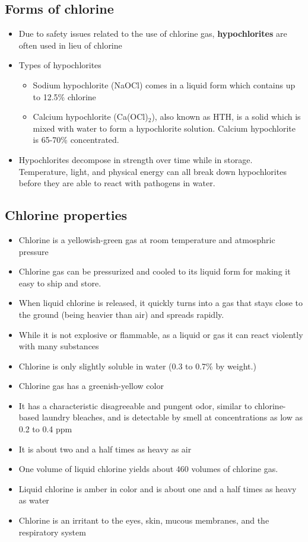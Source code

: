 \subsection{Forms of chlorine}

\begin{itemize}
	\item Due to safety issues related to the use of chlorine gas, \textbf{hypochlorites} are often used in lieu of chlorine
	\item Types of hypochlorites
	\begin{itemize}
	\item Sodium hypochlorite (NaOCl) comes in a liquid form which contains up to 12.5\% chlorine
	\item Calcium hypochlorite (Ca(OCl)$_2$), also known as HTH, is a solid which is mixed with water to form a hypochlorite solution. Calcium hypochlorite is 65-70\% concentrated.
	\end{itemize}
	\item Hypochlorites decompose in strength over time while in storage. Temperature, light, and physical energy can all break down hypochlorites before they are able to react with pathogens in water. 

\end{itemize} 

\subsection{Chlorine properties}
\begin{itemize}
	\item Chlorine is a yellowish-green gas at room temperature and atmosphric pressure
	\item Chlorine gas can be pressurized and cooled to its liquid form for making it easy to ship and store. 
	\item When liquid chlorine is released, it quickly turns into a gas that stays close to the ground (being heavier than air) and spreads rapidly.
	\item While it is not explosive or flammable, as a liquid or gas it can react violently with many substances 
	\item Chlorine is only slightly soluble in water (0.3 to 0.7\% by weight.) 
	\item Chlorine gas has a greenish-yellow color 
	\item It has a characteristic disagreeable and pungent odor, similar to chlorine-based laundry bleaches, and is detectable by smell at concentrations as low as 0.2 to 0.4 ppm
	\item It is about two and a half times as heavy as air
	\item One volume of liquid chlorine yields about 460 volumes of chlorine gas. 
	\item Liquid chlorine is amber in color and is about one and a half times as heavy as water 
	\item Chlorine is an irritant to the eyes, skin, mucous membranes, and the respiratory system 
\end{itemize}


